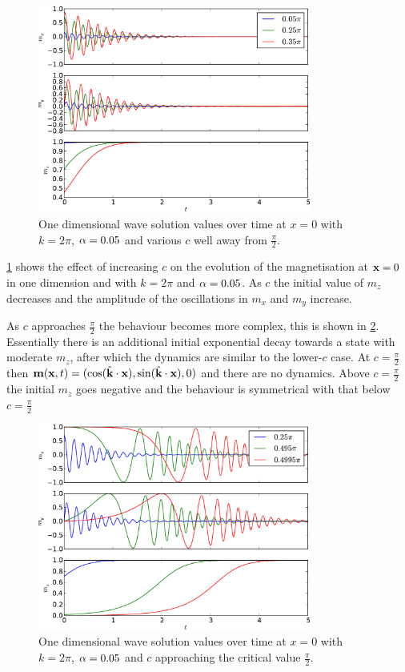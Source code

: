 \begin{figure}
  \centering
  \includegraphics[width=0.8\textwidth]{plots/wave_exact_solution_parameters/exact_solution_parameters.pdf}
  \caption{One dimensional wave solution values over time at $x=0$ with $k = 2\pi$, $\alpha = 0.05$ and various $c$ well away from $\frac{\pi}{2}$.}
  \label{fig:wave-solution-vary-c}
\end{figure}

\cref{fig:wave-solution-vary-c} shows the effect of increasing $c$ on the evolution of the magnetisation at $\mathbf{x} = 0$ in one dimension and with $k = 2\pi$ and $\alpha = 0.05$.
As $c$ the initial value of $m_z$ decreases and the amplitude of the oscillations in $m_x$ and $m_y$ increase.

As $c$ approaches $\frac{\pi}{2}$ the behaviour becomes more complex, this is shown in \cref{fig:wave-solution-vary-c-complex}.
Essentially there is an additional initial exponential decay towards a state with moderate $m_z$, after which the dynamics are similar to the lower-$c$ case.
At $c=\frac{\pi}{2}$ then $\mathbf{m}(\mathbf{x}, t)= (\cos({\hat{\mathbf{k}}}\cdot\mathbf{x}), \sin({\hat{\mathbf{k}}}\cdot\mathbf{x}), 0)$ and there are no dynamics.
Above $c=\frac{\pi}{2}$ the initial $m_z$ goes negative and the behaviour is symmetrical with that below $c=\frac{\pi}{2}$

\begin{figure}
  \centering
  \includegraphics[width=0.8\textwidth]{plots/wave_exact_solution_parameters/exact_solution_parameters_complex.pdf}
  \caption{One dimensional wave solution values over time at $x=0$ with $k = 2\pi$, $\alpha = 0.05$ and $c$ approaching the critical value $\frac{\pi}{2}$.}
  \label{fig:wave-solution-vary-c-complex}
\end{figure}



